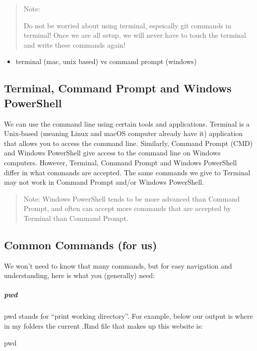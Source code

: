 \documentclass[
]{book}
\newenvironment{Shaded}{\begin{snugshade}}{\end{snugshade}}
\newcommand{\BuiltInTok}[1]{#1}
\providecommand{\tightlist}{%
  \setlength{\itemsep}{0pt}\setlength{\parskip}{0pt}}
\theoremstyle{definition}
\theoremstyle{definition}
\theoremstyle{definition}
\theoremstyle{definition}
\theoremstyle{remark}
\begin{document}
\begin{quote}
Note:

Do not be worried about using terminal, espeically git commands in terminal! Once we are all setup, we will never have to touch the terminal and write these commands again!
\end{quote}

\begin{itemize}
\tightlist
\item
  terminal (mac, unix based) vs command prompt (windows)
\end{itemize}

\subsection{Terminal, Command Prompt and Windows PowerShell}\label{terminal-command-prompt-and-windows-powershell}

We can use the command line using certain tools and applications. Terminal is a Unix-based (meaning Linux and macOS computer already have it) application that allows you to access the command line. Similarly, Command Prompt (CMD) and Windows PowerShell give access to the command line on Windows computers. However, Terminal, Command Prompt and Windows PowerShell differ in what commands are accepted. The same commands we give to Terminal may not work in Command Prompt and/or Windows PowerShell.

\begin{quote}
Note: Windows PowerShell tends to be more advanced than Command Prompt, and often can accept more commands that are accepted by Terminal than Command Prompt.
\end{quote}

\subsection{Common Commands (for us)}\label{common-commands-for-us}

We won't need to know that many commands, but for easy navigation and understanding, here is what you (generally) need:

\subparagraph*{pwd}\label{pwd}

pwd stands for ``print working directory''. For example, below our output is where in my folders the current .Rmd file that makes up this website is:

\begin{Shaded}
\begin{Highlighting}[]
\BuiltInTok{pwd}
\end{Highlighting}
\end{Shaded}
\end{document}
